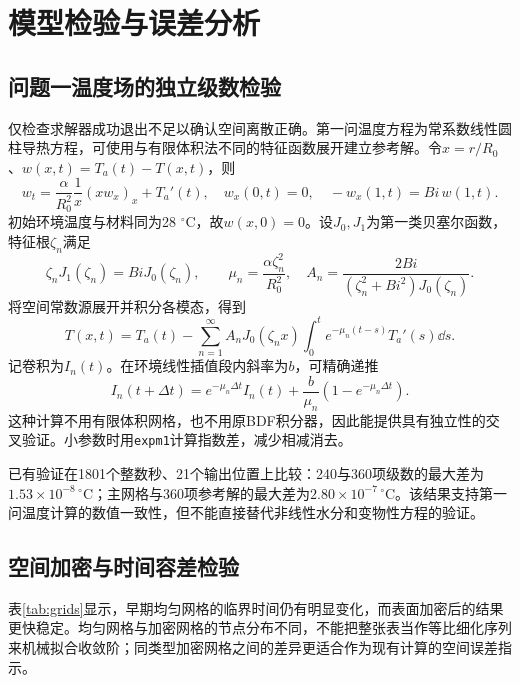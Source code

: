 \section{模型检验与误差分析}
\subsection{问题一温度场的独立级数检验}
仅检查求解器成功退出不足以确认空间离散正确。第一问温度方程为常系数线性圆柱导热方程，可使用与有限体积法不同的特征函数展开建立参考解\cite{carslaw,crank}。令$x=r/R_0$、$w(x,t)=T_a(t)-T(x,t)$，则
\begin{equation}
w_t=\frac{\alpha}{R_0^2}\frac1x(xw_x)_x+T_a'(t),\quad
w_x(0,t)=0,\quad -w_x(1,t)=Bi\,w(1,t).
\end{equation}
初始环境温度与材料同为28 $^\circ$C，故$w(x,0)=0$。设$J_0,J_1$为第一类贝塞尔函数，特征根$\zeta_n$满足
\begin{equation}
\zeta_nJ_1(\zeta_n)=BiJ_0(\zeta_n),\qquad
\mu_n=\frac{\alpha\zeta_n^2}{R_0^2},\quad
A_n=\frac{2Bi}{(\zeta_n^2+Bi^2)J_0(\zeta_n)}.
\end{equation}
将空间常数源展开并积分各模态，得到
\begin{equation}
T(x,t)=T_a(t)-\sum_{n=1}^{\infty}A_nJ_0(\zeta_nx)
\int_0^t e^{-\mu_n(t-s)}T_a'(s)\dd s .
\label{eq:series}
\end{equation}
记卷积为$I_n(t)$。在环境线性插值段内斜率为$b$，可精确递推
\begin{equation}
I_n(t+\Delta t)=e^{-\mu_n\Delta t}I_n(t)
+\frac{b}{\mu_n}(1-e^{-\mu_n\Delta t}).
\end{equation}
这种计算不用有限体积网格，也不用原BDF积分器，因此能提供具有独立性的交叉验证。小参数时用\texttt{expm1}计算指数差，减少相减消去。


已有验证在1801个整数秒、21个输出位置上比较：240与360项级数的最大差为$1.53\times10^{-8}\,^\circ$C；主网格与360项参考解的最大差为$2.80\times10^{-7}\,^\circ$C。该结果支持第一问温度计算的数值一致性，但不能直接替代非线性水分和变物性方程的验证。

\nextpage
\subsection{空间加密与时间容差检验}

表\ref{tab:grids}显示，早期均匀网格的临界时间仍有明显变化，而表面加密后的结果更快稳定。均匀网格与加密网格的节点分布不同，不能把整张表当作等比细化序列来机械拟合收敛阶；同类型加密网格之间的差异更适合作为现有计算的空间误差指示。

